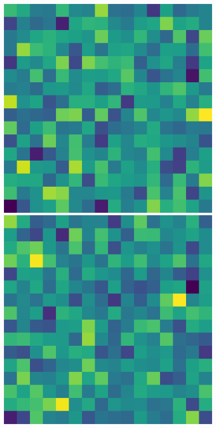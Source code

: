 \begin{figure}[h!]
{		\begin{minipage}[t]{3.5cm}
			\centering
			\includegraphics[width=0.9\linewidth]{figures/result/street/q3_3}
	\end{minipage}
		\begin{minipage}[t]{3.5cm}
			\centering
			\includegraphics[width=0.9\linewidth]{figures/result/street/q3_4}
	\end{minipage}}


\end{figure}
